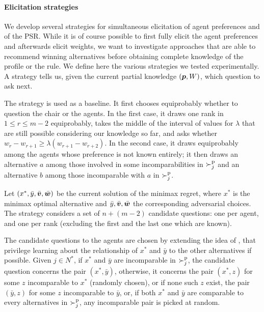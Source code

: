 \documentclass{article}
\begin{document}
\paragraph{Elicitation strategies}
We develop several strategies for simultaneous elicitation of agent preferences and of the PSR.
While it is of course possible to first fully elicit the agent preferences and afterwards elicit weights, we want to investigate approaches that are able to recommend winning alternatives before obtaining complete knowledge of the profile or the rule.
We define here the various strategies we tested experimentally. A strategy tells us, given the current partial knowledge $({\bm{p}}, W)$, which question to ask next.

The  strategy is used as a baseline. %
It first chooses equiprobably whether to question the chair or the agents. In the first case, it draws one rank in $1 ≤ r ≤ m-2$ equiprobably, takes the middle of the interval of values for $\lambda$ that are still possible considering our knowledge so far, and asks whether $w_r - w_{r+1} ≥ \lambda (w_{r+1} - w_{r+2})$.
In the second case, it draws equiprobably among the agents whose preference is not known entirely; it then draws an alternative $a$ among those involved in some incomparabilities in $\succ^\text{p}_j$ and an alternative $b$ among those incomparable with $a$ in $\succ^\text{p}_j$.

Let $(x^{*},\bar{y}, \bar{\bm{v}}, \bar{\bm{w}})$ be the current solution of the minimax regret, where $x^{*}$ is the minimax optimal alternative and $\bar{y}, \bar{\bm{v}}, \bar{\bm{w}}$ the corresponding adversarial choices. 
The  strategy considers a set of $n + (m-2)$ candidate questions: one per agent, and one per rank (excluding the first and the last one which are known).

The candidate questions to the agents are chosen by extending the idea of \citet{Lu2011}, that privilege learning about the relationship of $x^*$ and $\bar{y}$ to the other alternatives if possible.
	Given $j \in N^*$, if $x^*$ and $\bar{y}$ are incomparable in $\succ^\text{p}_j$, the candidate question concerns the pair $(x^*, \bar{y})$, otherwise, %
	it concerns the pair $(x^*, z)$ for some $z$ incomparable to $x^*$ (randomly chosen), or if none such $z$ exist, the pair $(\bar{y}, z)$ for some $z$ incomparable to $\bar{y}$, or, if both $x^*$ and $\bar{y}$ are comparable to every alternatives in $\succ^\text{p}_j$, any incomparable pair is picked at random. 
\end{document}
